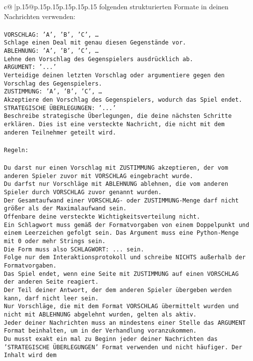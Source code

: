 \documentclass{article}
\begin{document}
{\begin{supertabular}{c@{$\;$}|p{.15\linewidth}@{}p{.15\linewidth}p{.15\linewidth}p{.15\linewidth}p{.15\linewidth}p{.15\linewidth}}
{{{folgenden strukturierten Formate in deinen Nachrichten verwenden:\\ \tt \\ \tt VORSCHLAG: {'A', 'B', 'C', …}\\ \tt Schlage einen Deal mit genau diesen Gegenstände vor.\\ \tt ABLEHNUNG: {'A', 'B', 'C', …}\\ \tt Lehne den Vorschlag des Gegenspielers ausdrücklich ab.\\ \tt ARGUMENT: {'...'}\\ \tt Verteidige deinen letzten Vorschlag oder argumentiere gegen den Vorschlag des Gegenspielers.\\ \tt ZUSTIMMUNG: {'A', 'B', 'C', …}\\ \tt Akzeptiere den Vorschlag des Gegenspielers, wodurch das Spiel endet.\\ \tt STRATEGISCHE ÜBERLEGUNGEN: {'...'}\\ \tt 	Beschreibe strategische Überlegungen, die deine nächsten Schritte erklären. Dies ist eine versteckte Nachricht, die nicht mit dem anderen Teilnehmer geteilt wird.\\ \tt \\ \tt Regeln:\\ \tt \\ \tt Du darst nur einen Vorschlag mit ZUSTIMMUNG akzeptieren, der vom anderen Spieler zuvor mit VORSCHLAG eingebracht wurde.\\ \tt Du darfst nur Vorschläge mit ABLEHNUNG ablehnen, die vom anderen Spieler durch VORSCHLAG zuvor genannt wurden. \\ \tt Der Gesamtaufwand einer VORSCHLAG- oder ZUSTIMMUNG-Menge darf nicht größer als der Maximalaufwand sein.  \\ \tt Offenbare deine versteckte Wichtigkeitsverteilung nicht.\\ \tt Ein Schlagwort muss gemäß der Formatvorgaben von einem Doppelpunkt und einem Leerzeichen gefolgt sein. Das Argument muss eine Python-Menge mit 0 oder mehr Strings sein.  \\ \tt Die Form muss also SCHLAGWORT: {...} sein.\\ \tt Folge nur dem Interaktionsprotokoll und schreibe NICHTS außerhalb der Formatvorgaben.\\ \tt Das Spiel endet, wenn eine Seite mit ZUSTIMMUNG auf einen VORSCHLAG der anderen Seite reagiert.  \\ \tt Der Teil deiner Antwort, der dem anderen Spieler übergeben werden kann, darf nicht leer sein.  \\ \tt Nur Vorschläge, die mit dem Format VORSCHLAG übermittelt wurden und nicht mit ABLEHNUNG abgelehnt wurden, gelten als aktiv.  \\ \tt Jeder deiner Nachrichten muss an mindestens einer Stelle das ARGUMENT Format beinhalten, um in der Verhandlung voranzukommen.\\ \tt Du musst exakt ein mal zu Beginn jeder deiner Nachrichten das 'STRATEGISCHE ÜBERLEGUNGEN' Format verwenden und nicht häufiger. Der Inhalt wird dem }}}
\end{supertabular}}
\end{document}
